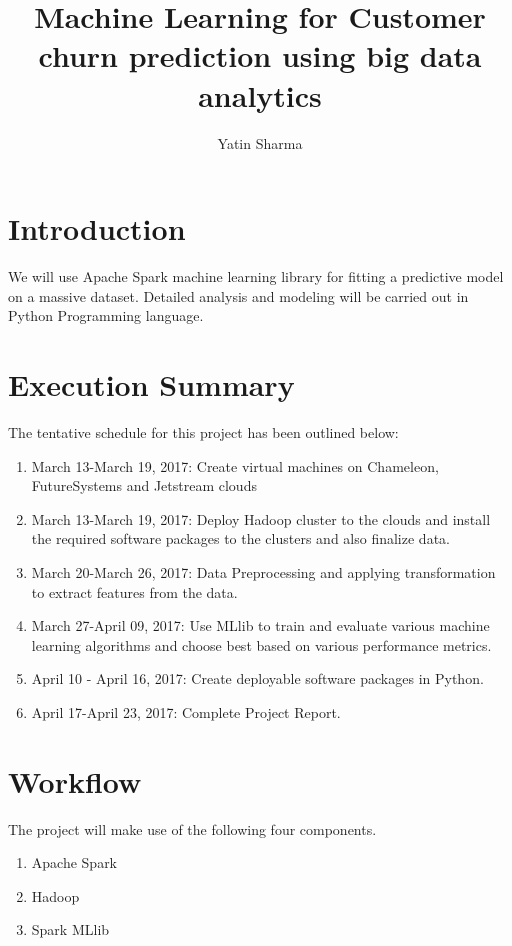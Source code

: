 \documentclass[9pt,twocolumn,twoside]{../../styles/osajnl}
\title{Machine Learning for Customer churn prediction using big data analytics}
\author[1,*]{Yatin Sharma}
\affil[1]{School of Informatics and Computing, Bloomington, IN 47408, U.S.A.}
\affil[*]{Corresponding authors: yatins@indiana.edu}
\begin{document}
\flushbottom %

\maketitle %

\tableofcontents %
\maketitle

\section{Introduction}
	We will use Apache Spark\cite{www-apache-spark} machine learning library for fitting a predictive model on a
	massive dataset. Detailed analysis and modeling will be carried out in Python
	Programming language.

\section{Execution Summary}
The tentative schedule for  this project has been outlined below:
\begin{enumerate}
	\item {March 13-March 19, 2017:} Create virtual machines on Chameleon, FutureSystems
	and Jetstream clouds
	\item {March 13-March 19, 2017:} Deploy Hadoop cluster to the clouds and install the
	required software packages to the clusters and also finalize data.
	\item {March 20-March 26, 2017:} Data Preprocessing and applying transformation to
	extract features from the data.
	\item {March 27-April 09, 2017:} Use MLlib to train and evaluate various machine
	learning algorithms and choose best based on various performance metrics.
	\item {April 10 - April 16, 2017:} Create deployable software packages in Python.
	\item {April 17-April 23, 2017:} Complete Project Report.
\end{enumerate}

\section{Workflow}
The project will make use of the following four components. 
\begin{enumerate}
    \item Apache Spark
    \item Hadoop
    \item Spark MLlib

\end{enumerate}
\end{document}
